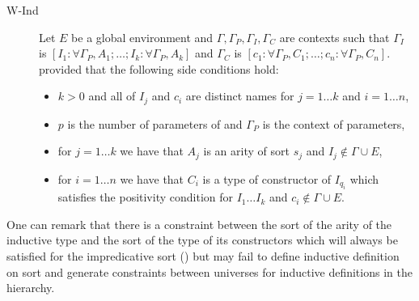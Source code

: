 \begin{description}
\item[W-Ind] Let $E$ be a global environment and
  $\Gamma,\Gamma_P,\Gamma_I,\Gamma_C$ are contexts such that
  $\Gamma_I$ is $[I_1:\forall \Gamma_P,A_1;\ldots;I_k:\forall
  \Gamma_P,A_k]$ and $\Gamma_C$ is 
  $[c_1:\forall \Gamma_P,C_1;\ldots;c_n:\forall \Gamma_P,C_n]$. 
provided that the following side conditions hold:
\begin{itemize}
\item $k>0$ and all of $I_j$ and $c_i$ are distinct names for $j=1\ldots  k$ and $i=1\ldots  n$,
\item $p$ is the number of parameters of 
  and $\Gamma_P$ is the context of parameters, 
\item for $j=1\ldots  k$ we have that $A_j$ is an arity of sort $s_j$ and $I_j
  \notin \Gamma \cup E$,
\item for $i=1\ldots  n$ we have that $C_i$ is a type of constructor of
  $I_{q_i}$ which satisfies the positivity condition for $I_1 \ldots  I_k$
  and $c_i \notin \Gamma \cup E$.
\end{itemize}
\end{description}
One can remark that there is a constraint between the sort of the
arity of the inductive type and the sort of the type of its
constructors which will always be satisfied for the impredicative sort
(\Prop) but may fail to define inductive definition 
on sort \Set{} and generate constraints between universes for
inductive definitions in the {\Type} hierarchy.

